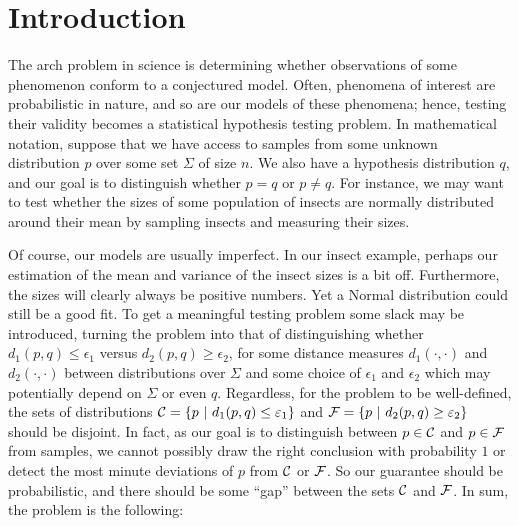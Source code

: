 \section{Introduction} \label{sec:intro}

The arch problem in science is determining whether observations of some phenomenon conform to a conjectured model. Often, phenomena of interest are probabilistic in nature, and so are our models of these phenomena; hence, testing their validity becomes a statistical hypothesis testing problem. In mathematical notation, suppose that we have access to samples from some unknown distribution $p$ over some set $\Sigma$ of size $n$. We also have a hypothesis distribution $q$, and our goal is to distinguish whether $p=q$ or $p \neq q$. For instance, we may want to test whether the sizes of some population of insects are normally distributed around their mean by sampling insects and measuring their sizes.

Of course, our models are usually imperfect. In our insect example, perhaps our estimation of the mean and variance of the insect sizes is a bit off. Furthermore, the sizes will clearly always be positive numbers. Yet a Normal distribution could still be a good fit. To get a meaningful testing problem some slack may be introduced, turning the problem into that of distinguishing whether $d_1(p,q) \le \epsilon_1$ versus $d_2(p,q)\ge\epsilon_2$, for some distance measures $d_1(\cdot,\cdot)$ and $d_2(\cdot,\cdot)$ between distributions over $\Sigma$ and some choice of $\epsilon_1$ and $\epsilon_2$ which may potentially depend on $\Sigma$ or even $q$. Regardless, for the problem to be well-defined, the sets of distributions ${\cal C} = \{p~|~d_1(p,q) \le \epsilon_1 \}$ and ${\cal F} = \{p~|~d_2(p,q) \ge \epsilon_2 \}$ should be disjoint. In fact, as our goal is to distinguish between $p \in {\cal C}$ and $p \in {\cal F}$ from samples, we cannot possibly draw the right conclusion with probability $1$ or detect the most minute deviations of $p$ from ${\cal C}$ or ${\cal F}$. So our guarantee should be probabilistic, and there should be some ``gap'' between the sets $\cal C$ and $\cal F$. In sum, the problem is the following:

\medskip {}

